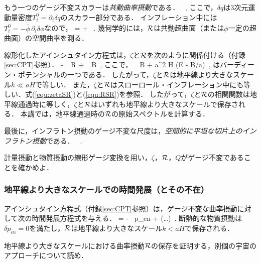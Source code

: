 もう一つのゲージ不変スカラーは{\it 共動曲率摂動}である．
\beq
{}\, ,
\eeq
ここで，$\delta q$は3次元運動量密度$T^0_i = \partial_i \delta q$のスカラー部分である．
インフレーション中には$T^0_i = - \dot{\bar \phi}\, \partial_i \delta \phi$なので，
\beq
\label{equ:RSR}
\R = \Psi +  \delta \phi\, .
\eeq
幾何学的には，${\cal R}$は共動超曲面（または$\phi$一定の超曲面）の空間曲率を測る．%

線形化したアインシュタイン方程式は，$\zeta$と${\cal R}$を次のように関係付ける（付録\ref{sec:CPT}参照）．
\beq
-\zeta = {\cal R} +   \Psi_{\rm B}\, ,
\eeq
ここで，
\beq
\Psi_{\rm B} \equiv \psi + a^2 H (\dot E - B/a)\, ,
\eeq
はバーディーン・ポテンシャルの一つである\cite{Bardeen:1980kt}．
したがって，$\zeta$と${\cal R}$は地平線より大きなスケール$k \ll aH$で等しい．
また，$\zeta$と${\cal R}$はスローロール・インフレーション中にも等しい．式(\ref{equ:zetaSR})と(\ref{equ:RSR})を参照．
したがって，$\zeta$と${\cal R}$の相関関数は地平線通過時に等しく，$\zeta$と${\cal R}$はいずれも地平線より大きなスケールで保存される．
本講では，地平線通過時の${\cal R}$の原始スペクトルを計算する．

最後に，インフラトン摂動のゲージ不変な尺度は，{\it 空間的に平坦な切片上のインフラトン摂動}である．
\beq
{}\, .
\eeq

\begin{thm}[ゲージ不変な摂動]
計量摂動と物質摂動の線形ゲージ変換を用い，$\zeta$，${\cal R}$，$Q$がゲージ不変であることを確かめよ．
\label{ex:gauge2}
\end{thm}


\subsubsection{地平線より大きなスケールでの時間発展（とその不在）}


アインシュタイン方程式（付録\ref{sec:CPT}参照）は，ゲージ不変な曲率摂動に対して次の時間発展方程式を与える．
\beq
\dot \R = -  \, \delta p_{en} +  \Bigl(\dots \Bigr)\, .
\eeq
断熱的な物質摂動は$\delta p_{en} =0$を満たし，${\cal R}$は地平線より大きなスケール$k < aH$で保存される．

\begin{thm}[別個の宇宙のアプローチ]
地平線より大きなスケールにおける曲率摂動${\cal R}$の保存を証明する，別個の宇宙のアプローチ\cite{Wands:2000dp}について読め．
\label{ex:separate:source-duplicate-1}
\end{thm}


